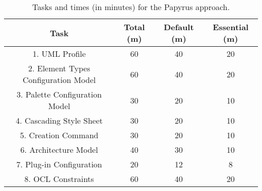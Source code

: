 \begin{table}
	\centering
	\setlength{\tabcolsep}{3.5pt} 
	\caption{Tasks and times (in minutes) for the Papyrus approach.}
	\begin{tabular}{|c|c|c|c|}
		\cline{1-4}
		\textbf{Task} & Total (m) & Default (m) & Essential (m) \\ \hline
		1. UML Profile & 60 & 40 & 20 \\ \hline
		2. Element Types Configuration Model & 60 & 40 & 20 \\ \hline
		3. Palette Configuration Model & 30 & 20 & 10 \\ \hline
		4. Cascading Style Sheet & 30 & 20 & 10 \\ \hline
		5. Creation Command & 30 & 20 & 10 \\ \hline
		6. Architecture Model & 40 & 30 & 10 \\ \hline
		7. Plug-in Configuration & 20 & 12 & 8 \\ \hline
		8. OCL Constraints & 60 & 40 & 20 \\ \hline
	\end{tabular}
	\label{tab:manual}
\end{table}


